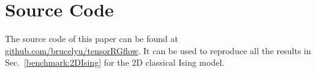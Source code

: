 \documentclass[aps,prr,reprint,superscriptaddress,floatfix]{revtex4-2}
\begin{document}
\appendix
\section{Source Code\label{append:sc}}
The source code of this paper can be found at \href{https://github.com/brucelyu/tensorRGflow}{github.com/brucelyu/tensorRGflow}.
It can be used to reproduce all the results in Sec.~\ref{benchmark:2DIsing} for the 2D classical Ising model.


\end{document}

